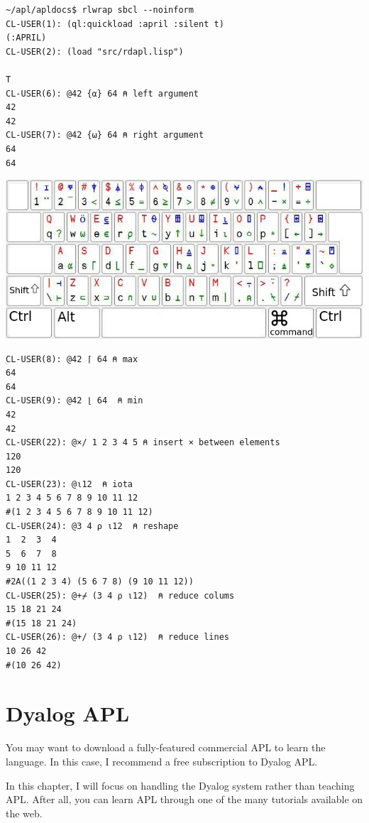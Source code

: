 \documentclass[a4paper,12pt]{book}
\begin{document}
\begin{lstlisting}[language=apl]
~/apl/apldocs$ rlwrap sbcl --noinform
CL-USER(1): (ql:quickload :april :silent t)
(:APRIL)
CL-USER(2): (load "src/rdapl.lisp")

T
CL-USER(6): @42 {⍺} 64 ⍝ left argument
42
42
CL-USER(7): @42 {⍵} 64 ⍝ right argument
64
64
\end{lstlisting}

\noindent
\includegraphics{figs/aplkb-largekeys.jpg}

\begin{lstlisting}[language=apl]
CL-USER(8): @42 ⌈ 64 ⍝ max
64
64
CL-USER(9): @42 ⌊ 64  ⍝ min
42
42
CL-USER(22): @×/ 1 2 3 4 5 ⍝ insert × between elements
120
120
CL-USER(23): @⍳12  ⍝ iota
1 2 3 4 5 6 7 8 9 10 11 12
#(1 2 3 4 5 6 7 8 9 10 11 12)
CL-USER(24): @3 4 ⍴ ⍳12  ⍝ reshape
1  2  3  4
5  6  7  8
9 10 11 12
#2A((1 2 3 4) (5 6 7 8) (9 10 11 12))
CL-USER(25): @+⌿ (3 4 ⍴ ⍳12)  ⍝ reduce colums
15 18 21 24
#(15 18 21 24)
CL-USER(26): @+/ (3 4 ⍴ ⍳12)  ⍝ reduce lines
10 26 42
#(10 26 42)
\end{lstlisting}

\chapter{Dyalog APL}\large
You may want to download a fully-featured commercial
APL to learn the language. In this case, I recommend
a free subscription to Dyalog APL.

In this chapter, I will focus on handling the
Dyalog system rather than teaching APL.
After all, you can learn APL through one
of the many tutorials available on the web.
\end{document}
